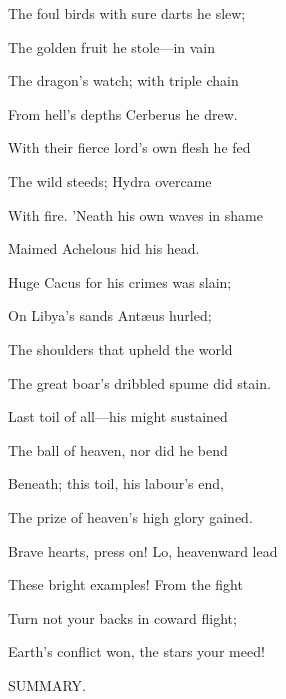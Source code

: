 The foul birds with sure darts he slew;

The golden fruit he stole—in vain

The dragon's watch; with triple chain

From hell's depths Cerberus he drew.

With their fierce lord's own flesh he fed

The wild steeds; Hydra overcame

With fire. 'Neath his own waves in shame

Maimed Achelous hid his head.

Huge Cacus for his crimes was slain;

On Libya's sands Antæus hurled;

The shoulders that upheld the world

The great boar's dribbled spume did stain.

Last toil of all—his might sustained

The ball of heaven, nor did he bend

Beneath; this toil, his labour's end,

The prize of heaven's high glory gained.

Brave hearts, press on! Lo, heavenward lead

These bright examples! From the fight

Turn not your backs in coward flight;

Earth's conflict won, the stars your meed!


SUMMARY.

